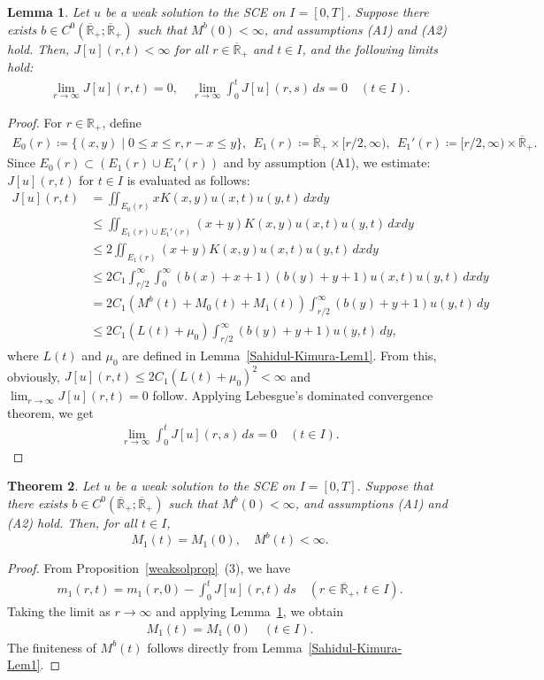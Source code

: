 \documentclass[a4paper,11pt]{article}
\newtheorem{thm}{Theorem}[section]
\newtheorem{lem}[thm]{Lemma}
\def\Rp{{\mathbb R}_+}
\def\Rb{\overline{{\mathbb R}}_+}
\begin{document}
\begin{lem} \label{Sahidul-Kimura-Lem2}
Let $u$ be a weak solution to the SCE on $I=[0,T]$. Suppose there exists $b\in C^0(\Rb;\Rb)$ such that $M^b(0)<\infty$, and assumptions (A1) and (A2) hold.
Then, $J[u](r,t)<\infty$ for all $r\in\Rb$ and $t\in I$, and the following limits hold:
\begin{align*}
\lim_{r\to\infty}J[u](r,t)=0,\quad
\lim_{r\to\infty}\int^t_0 J[u](r,s)\,ds=0
\quad(t\in I).
\end{align*}
\end{lem}
\begin{proof}
For $r\in\Rp$, define 
\begin{align*}
E_0(r) \coloneqq 
\{(x,y)\mid 0\leq x\leq r, r-x\leq y\},~~
E_1(r) \coloneqq 
\Rb \times [r/2, \infty),~~
E_1'(r) \coloneqq 
[r/2,\infty)\times \Rb.
\end{align*}
Since $E_0(r)\subset (E_1(r)\cup E_1'(r))$ and by assumption (A1), 
we estimate:
$J[u](r,t)$ for $t\in I$ is evaluated as follows:
\begin{align*}
J[u](r,t) 
&= 
\iint_{E_0(r)} xK(x,y)u(x,t)u(y,t)\,dxdy \\
&\leq 
\iint_{E_1(r)\cup E_1'(r)} (x+y)K(x,y)u(x,t)u(y,t)\,dxdy \\
&\leq
2 \iint_{E_1(r)} (x+y)K(x,y)u(x,t)u(y,t)\,dxdy \\
&\leq
2C_1 \int^\infty_{r/2} \int_0^\infty(b(x)+x+1)(b(y)+y+1)u(x,t)u(y,t)\,dxdy \\
&= 
2C_1 \left(M^b(t)+M_0(t)+M_1(t)\right)\int^\infty_{r/2} (b(y)+y+1)u(y,t)\, dy \\
&\le 2C_1 \left(L(t)+\mu_0\right)\int^\infty_{r/2} (b(y)+y+1)u(y,t)\, dy,
  \end{align*}
where $L(t)$ and $\mu_0$ are defined in Lemma~\ref{Sahidul-Kimura-Lem1}.
From this, obviously, $J[u](r,t)\le 2C_1(L(t)+\mu_0)^2<\infty$ and  
$\lim_{r\to \infty}J[u](r,t)=0$ follow.
Applying Lebesgue's dominated convergence theorem,
we get
\begin{align*}
    \lim_{r\to\infty} \int^t_0 J[u](r,s)\,ds = 0 \quad(t\in I).
\end{align*}
\end{proof}

\begin{thm}\label{mainth1}
Let $u$ be a weak solution to the SCE on $I=[0,T]$. Suppose that there exists $b\in C^0(\Rb;\Rb)$ such that $M^b(0)<\infty$, and assumptions (A1) and (A2) hold.
Then, for all $t\in I$, 
\[
M_1(t)=M_1(0),\quad M^b(t)<\infty.
\]
\end{thm}
\begin{proof}
From Proposition~\ref{weaksolprop}~(3), we have
\begin{align*}
 m_1(r,t)=m_1(r,0)-\int^t_0 J[u](r,t)\,ds
 \quad (r\in\Rb,~t\in I).
\end{align*}
Taking the limit as $r\to\infty$ and applying Lemma~\ref{Sahidul-Kimura-Lem2}, we obtain
  \begin{align*}
    M_1(t) =M_1(0)\quad(t\in I).
  \end{align*}
The finiteness of $M^b(t)$ follows directly from Lemma~\ref{Sahidul-Kimura-Lem1}.
\end{proof}
\end{document}
